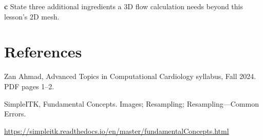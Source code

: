 \documentclass[11pt,letterpaper]{article}
\theoremstyle{definition}\newtheorem{definition}{Definition}\newtheorem{example}{Example}
\numberwithin{equation}{section}
\begin{document}
\textbf{c} State three additional ingredients a 3D flow calculation needs beyond this lesson's 2D mesh.

\section*{References}
\noindent\begin{minipage}{\linewidth}
Zan Ahmad, Advanced Topics in Computational Cardiology syllabus, Fall 2024. PDF pages 1--2.

\end{minipage}\par\medskip
\noindent\begin{minipage}{\linewidth}
SimpleITK, Fundamental Concepts. Images; Resampling; Resampling---Common Errors.

\url{https://simpleitk.readthedocs.io/en/master/fundamentalConcepts.html}
\end{minipage}\par\medskip
\end{document}
